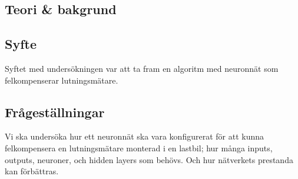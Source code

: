 \subsection{Teori \& bakgrund}

\subsection{Syfte}
Syftet med  undersökningen var att ta fram en algoritm med neuronnät som
felkompenserar lutningsmätare.

\subsection{Frågeställningar}
Vi ska undersöka hur ett neuronnät ska vara konfigurerat för att kunna
felkompensera en lutningsmätare monterad i en lastbil; hur många inputs,
outputs, neuroner, och hidden layers som behövs.
Och hur nätverkets prestanda kan förbättras.
